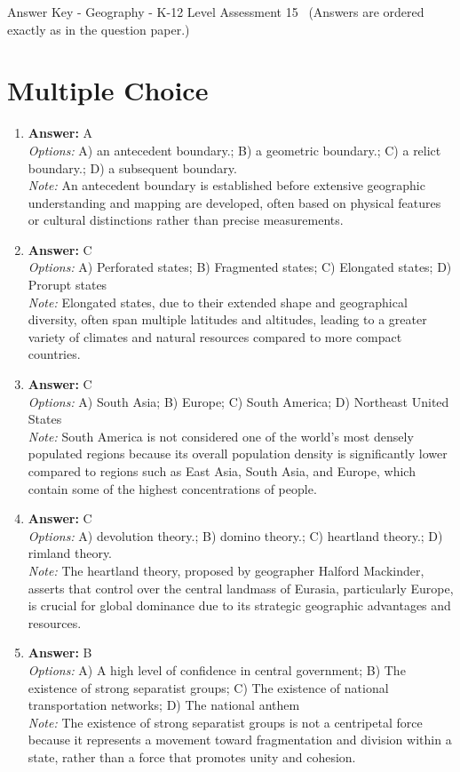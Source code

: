 \documentclass[12pt]{article}
\begin{document}
\begin{center}
Answer Key - Geography - K-12 Level Assessment 15 \
\small (Answers are ordered exactly as in the question paper.)
\end{center}

\section*{Multiple Choice}
\begin{enumerate}[label=\arabic*.]
\item \textbf{Answer:} A
\\ \textit{Options:} A) an antecedent boundary.; B) a geometric boundary.; C) a relict boundary.; D) a subsequent boundary.
\\ \textit{Note:} An antecedent boundary is established before extensive geographic understanding and mapping are developed, often based on physical features or cultural distinctions rather than precise measurements.
\item \textbf{Answer:} C
\\ \textit{Options:} A) Perforated states; B) Fragmented states; C) Elongated states; D) Prorupt states
\\ \textit{Note:} Elongated states, due to their extended shape and geographical diversity, often span multiple latitudes and altitudes, leading to a greater variety of climates and natural resources compared to more compact countries.
\item \textbf{Answer:} C
\\ \textit{Options:} A) South Asia; B) Europe; C) South America; D) Northeast United States
\\ \textit{Note:} South America is not considered one of the world's most densely populated regions because its overall population density is significantly lower compared to regions such as East Asia, South Asia, and Europe, which contain some of the highest concentrations of people.
\item \textbf{Answer:} C
\\ \textit{Options:} A) devolution theory.; B) domino theory.; C) heartland theory.; D) rimland theory.
\\ \textit{Note:} The heartland theory, proposed by geographer Halford Mackinder, asserts that control over the central landmass of Eurasia, particularly Europe, is crucial for global dominance due to its strategic geographic advantages and resources.
\item \textbf{Answer:} B
\\ \textit{Options:} A) A high level of confidence in central government; B) The existence of strong separatist groups; C) The existence of national transportation networks; D) The national anthem
\\ \textit{Note:} The existence of strong separatist groups is not a centripetal force because it represents a movement toward fragmentation and division within a state, rather than a force that promotes unity and cohesion.
\end{enumerate}
\end{document}
